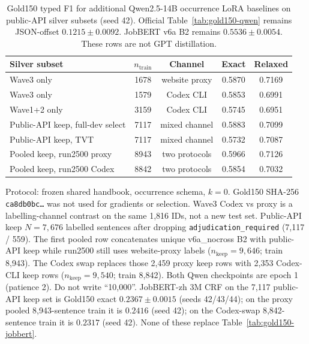 
\begin{table}[t]
\caption{Gold150 typed F1 for additional Qwen2.5-14B occurrence LoRA baselines on public-API silver subsets (seed 42). Official Table~\ref{tab:gold150-qwen} remains JSON-offset $0.1215\pm0.0092$. JobBERT v6a B2 remains $0.5536\pm0.0054$. These rows are not GPT distillation.}
\label{tab:public-api-silver-qwen}
\centering
\begin{tabular}{lcccc}
\hline
Silver subset & $n_{\mathrm{train}}$ & Channel & Exact & Relaxed \\
\hline
Wave3 only & 1678 & website proxy & 0.5870 & 0.7169 \\
Wave3 only & 1579 & Codex CLI & 0.5853 & 0.6991 \\
Wave1+2 only & 3159 & Codex CLI & 0.5745 & 0.6951 \\
Public-API keep, full-dev select & 7117 & mixed channel & 0.5883 & 0.7099 \\
Public-API keep, TVT & 7117 & mixed channel & 0.5732 & 0.7087 \\
Pooled keep, run2500 proxy & 8943 & two protocols & 0.5966 & 0.7126 \\
Pooled keep, run2500 Codex & 8842 & two protocols & 0.5854 & 0.7032 \\
\hline
\end{tabular}

\vspace{0.4em}
{\small Protocol: frozen shared handbook, occurrence schema, $k{=}0$. Gold150 SHA-256 \texttt{ca8db0bc\ldots} was not used for gradients or selection.
Wave3 Codex vs proxy is a labelling-channel contrast on the same 1,816 IDs, not a new test set.
Public-API keep $N{=}7{,}676$ labelled sentences after dropping \texttt{adjudication\_required} (7,117 / 559).
The first pooled row concatenates unique v6a\_nocross B2 with public-API keep while run2500 still uses website-proxy labels ($n_{\mathrm{keep}}{=}9{,}646$; train 8,943). The Codex swap replaces those 2,459 proxy keep rows with 2,353 Codex-CLI keep rows ($n_{\mathrm{keep}}{=}9{,}540$; train 8,842). Both Qwen checkpoints are epoch 1 (patience 2). Do not write ``10,000''.
JobBERT-zh 3M CRF on the 7,117 public-API keep set is Gold150 exact $0.2367\pm0.0015$ (seeds 42/43/44); on the proxy pooled 8,943-sentence train it is $0.2416$ (seed 42); on the Codex-swap 8,842-sentence train it is $0.2317$ (seed 42). None of these replace Table~\ref{tab:gold150-jobbert}.}
\end{table}
